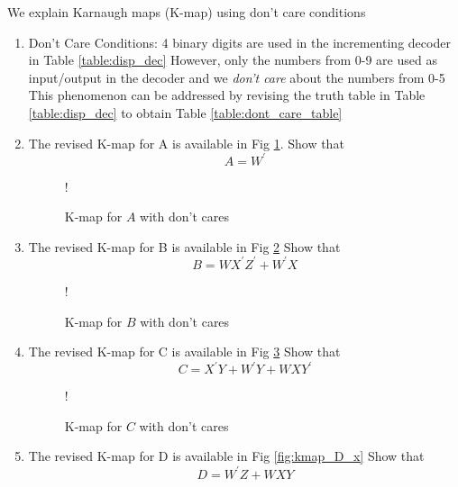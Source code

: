 We explain Karnaugh maps (K-map) using don't care conditions
%
\begin{enumerate}[label=\arabic*.,ref=\theenumi]
\item {Don't Care Conditions: }
4 binary digits are used in the incrementing decoder in 
		Table 
\ref{table:disp_dec}
		However, only the numbers from 0-9 are used as input/output
in the decoder and we {\em don't care} about the numbers from 0-5  This phenomenon can be addressed by revising the truth table in 
		Table 
\ref{table:disp_dec}
to obtain Table \ref{table:dont_care_table}
\begin{table*}[!ht]
	\centering

\caption{}
\label{table:dont_care_table}
\end{table*}
\item  The revised K-map for A is available in Fig \ref{fig:kmap_A_x}.  Show that 
\begin{equation}
A = {W}^{\prime}
\end{equation}
\begin{figure}[H]
\resizebox {\columnwidth} {!} {

}
\caption{K-map for $A$ with don't cares}
\label{fig:kmap_A_x}
\end{figure}
%
\item  The revised K-map for B is available in Fig \ref{fig:kmap_B_x}  Show that 
%
\begin{equation}
B = WX^{\prime}Z^{\prime} + W^{\prime}X
\end{equation}
\begin{figure}[H]
\resizebox {\columnwidth} {!} {

}
\caption{K-map for $B$ with don't cares}
\label{fig:kmap_B_x}
\end{figure}
%
\item  The revised K-map for C is available in Fig \ref{fig:kmap_C_x}  Show that 
%
\begin{equation}
C = {X}^{\prime}{Y} + {W}^{\prime}{Y} + {W}{X}{Y}^{\prime}
\end{equation}
\begin{figure}[H]
\resizebox {\columnwidth} {!} {

}
\caption{K-map for $C$ with don't cares}
\label{fig:kmap_C_x}
\end{figure}
%
\item  The revised K-map for D is available in Fig \ref{fig:kmap_D_x}  Show that 
%
\begin{equation}
D  = {W}^{\prime}{Z} + {W}{X}{Y}
\end{equation}

\end{enumerate}
